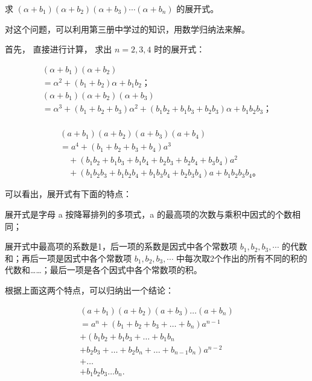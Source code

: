 求
\((\alpha + b_{1})(\alpha + b_{2})(\alpha + b_{3})\cdots (\alpha + b_{n})\)
的展开式。

对这个问题，可以利用第三册中学过的知识，用数学归纳法来解。

首先， 直接进行计算， 求出 \(n = 2, 3, 4\) 时的展开式：

\[
\begin{array}{l} (\alpha + b _ {1}) (\alpha + b _ {2}) \\ = \alpha^ {2} + (b _ {1} + b _ {2}) \alpha + b _ {1} b _ {2}\text{；} \\ (\alpha + b _ {1}) (\alpha + b _ {2}) (\alpha + b _ {3}) \\ = \alpha^ {3} + \left(b _ {1} + b _ {2} + b _ {3}\right) \alpha^ {2} + \left(b _ {1} b _ {2} + b _ {1} b _ {3} + b _ {2} b _ {3}\right) \alpha + b _ {1} b _ {2} b _ {3}\text{；} \\ \end{array}
\]

\[
\begin{aligned}
&(a+b_1)(a+b_2)(a+b_3)(a+b_4)\\
&=a^4+(b_1+b_2+b_3+b_4)a^3\\
&\quad+(b_1b_2+b_1b_3+b_1b_4+b_2b_3+b_2b_4+b_3b_4)a^2\\
&\quad+(b_1b_2b_3+b_1b_2b_4+b_1b_3b_4+b_2b_3b_4)a+b_1b_2b_3b_4\text{。}
\end{aligned}
\]

可以看出，展开式有下面的特点：

展开式是字母 a 按降幂排列的多项式，a
的最高项的次数与乘积中因式的个数相同；

展开式中最高项的系数是1，后一项的系数是因式中各个常数项
\(b_{1}, b_{2}, b_{3}, \cdots\) 的代数和；再后一项是因式中各个常数项
\(b_{1}, b_{2}, b_{3}, \cdots\)
中每次取2个作出的所有不同的积的代数和\ldots\ldots；最后一项是各个因式中各个常数项的积。

根据上面这两个特点，可以归纳出一个结论：

\[
\begin{array}{l} \left(a + b _ {1}\right) \left(a + b _ {2}\right) \left(a + b _ {3}\right) \dots \left(a + b _ {n}\right) \\ = a ^ {n} + \left(b _ {1} + b _ {2} + b _ {3} + \dots + b _ {n}\right) a ^ {n - 1} \\ + \left(b _ {1} b _ {2} + b _ {1} b _ {3} + \dots + b _ {1} b _ {n} \right. \\ \left. + b _ {2} b _ {3} + \dots + b _ {2} b _ {n} + \dots + b _ {n - 1} b _ {n}\right) a ^ {n - 2} \\ + \dots \\ + b _ {1} b _ {2} b _ {3} \dots b _ {n}. \tag {1} \\ \end{array}
\]

